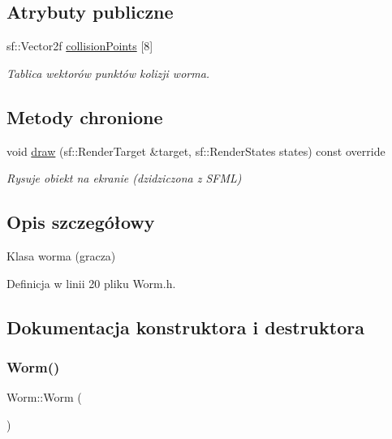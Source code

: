 \subsection*{Atrybuty publiczne}
\begin{DoxyCompactItemize}
\item 
sf\+::\+Vector2f \mbox{\hyperlink{class_worm_a6e519d20cdeca0c88847c0b7284ca302}{collision\+Points}} \mbox{[}8\mbox{]}
\begin{DoxyCompactList}\small\item\em Tablica wektorów punktów kolizji worma. \end{DoxyCompactList}\end{DoxyCompactItemize}
\subsection*{Metody chronione}
\begin{DoxyCompactItemize}
\item 
void \mbox{\hyperlink{class_worm_adc9fd6dc3b770d4feada327666f31ee3}{draw}} (sf\+::\+Render\+Target \&target, sf\+::\+Render\+States states) const override
\begin{DoxyCompactList}\small\item\em Rysuje obiekt na ekranie (dzidziczona z S\+F\+ML) \end{DoxyCompactList}\end{DoxyCompactItemize}


\subsection{Opis szczegółowy}
Klasa worma (gracza) 

Definicja w linii 20 pliku Worm.\+h.



\subsection{Dokumentacja konstruktora i destruktora}
\mbox{\label{class_worm_aaec23e2156f969303d6bfac36cae63e3}} 
\subsubsection{\texorpdfstring{Worm()}{Worm()}}
{\footnotesize\ttfamily Worm\+::\+Worm (\begin{DoxyParamCaption}{ }\end{DoxyParamCaption})}




